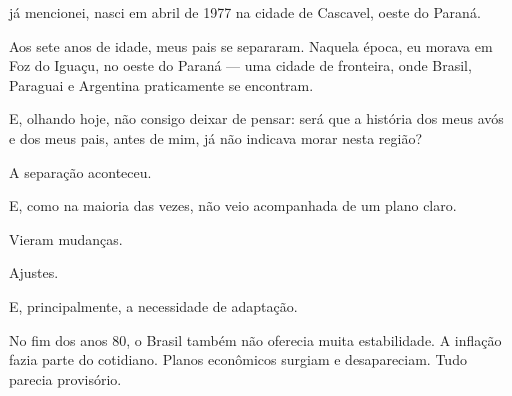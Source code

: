 \raggedbottom
\cleardoublepage




 já mencionei, nasci em abril de 1977 na cidade de Cascavel, oeste do Paraná.

Aos sete anos de idade, meus pais se separaram. Naquela época, eu morava em Foz do Iguaçu, no oeste do Paraná — uma cidade de fronteira, onde Brasil, Paraguai e Argentina praticamente se encontram.

E, olhando hoje, não consigo deixar de pensar: será que a história dos meus avós e dos meus pais, antes de mim, já não indicava morar nesta região?

A separação aconteceu. 

E, como na maioria das vezes, não veio acompanhada de um plano claro.

Vieram mudanças.

Ajustes.

E, principalmente, a necessidade de adaptação.

No fim dos anos 80, o Brasil também não oferecia muita estabilidade. A inflação fazia parte do cotidiano. Planos econômicos surgiam e desapareciam. Tudo parecia provisório.

